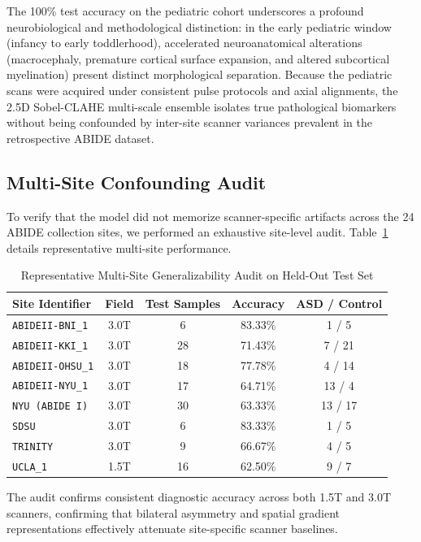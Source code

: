 \documentclass[conference]{IEEEtran}
\begin{document}
The 100\% test accuracy on the pediatric cohort underscores a profound neurobiological and methodological distinction: in the early pediatric window (infancy to early toddlerhood), accelerated neuroanatomical alterations (macrocephaly, premature cortical surface expansion, and altered subcortical myelination) present distinct morphological separation. Because the pediatric scans were acquired under consistent pulse protocols and axial alignments, the 2.5D Sobel-CLAHE multi-scale ensemble isolates true pathological biomarkers without being confounded by inter-site scanner variances prevalent in the retrospective ABIDE dataset.

\subsection{Multi-Site Confounding Audit}
To verify that the model did not memorize scanner-specific artifacts across the 24 ABIDE collection sites, we performed an exhaustive site-level audit. Table~\ref{tab:site_audit} details representative multi-site performance.

\begin{table}[h]
\centering
\caption{Representative Multi-Site Generalizability Audit on Held-Out Test Set}
\label{tab:site_audit}
\begin{tabular}{lcccc}
\toprule
\textbf{Site Identifier} & \textbf{Field} & \textbf{Test Samples} & \textbf{Accuracy} & \textbf{ASD / Control} \\
\midrule
\texttt{ABIDEII-BNI\_1} & 3.0T & 6 & 83.33\% & 1 / 5 \\
\texttt{ABIDEII-KKI\_1} & 3.0T & 28 & 71.43\% & 7 / 21 \\
\texttt{ABIDEII-OHSU\_1} & 3.0T & 18 & 77.78\% & 4 / 14 \\
\texttt{ABIDEII-NYU\_1} & 3.0T & 17 & 64.71\% & 13 / 4 \\
\texttt{NYU (ABIDE I)} & 3.0T & 30 & 63.33\% & 13 / 17 \\
\texttt{SDSU} & 3.0T & 6 & 83.33\% & 1 / 5 \\
\texttt{TRINITY} & 3.0T & 9 & 66.67\% & 4 / 5 \\
\texttt{UCLA\_1} & 1.5T & 16 & 62.50\% & 9 / 7 \\
\bottomrule
\end{tabular}
\end{table}

The audit confirms consistent diagnostic accuracy across both 1.5T and 3.0T scanners, confirming that bilateral asymmetry and spatial gradient representations effectively attenuate site-specific scanner baselines.
\end{document}
